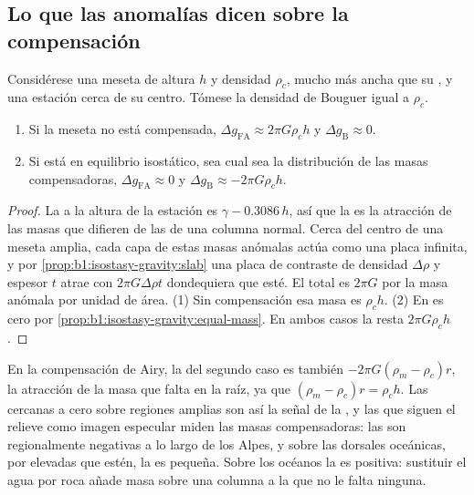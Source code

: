 \subsection*{Lo que las anomalías dicen sobre la compensación}

\begin{proposition}\label{prop:b1:isostasy-gravity:broad}
Considérese una meseta de altura $h$ y densidad $\rho_c$, mucho más ancha que su , y una estación cerca de
su centro. Tómese la densidad de Bouguer igual a $\rho_c$.
\begin{enumerate}
  \item Si la meseta no está compensada, $\Delta g_{\mathrm{FA}} \approx
        2\pi G\rho_c h$ y $\Delta g_{\mathrm B} \approx 0$.
  \item Si está en equilibrio isostático, sea cual sea la distribución de las masas compensadoras,
        $\Delta g_{\mathrm{FA}} \approx 0$ y $\Delta g_{\mathrm B} \approx -2\pi G\rho_c h$.
\end{enumerate}
\end{proposition}

\begin{proof}
La  a la altura de la estación es $\gamma - 0.3086\,h$, así que la  es la atracción de las
masas que difieren de las de una columna normal. Cerca del centro de una meseta amplia, cada capa de estas masas anómalas actúa
como una placa infinita, y por \cref{prop:b1:isostasy-gravity:slab} una placa de contraste de densidad $\Delta\rho$ y espesor $t$
atrae con $2\pi G\Delta\rho
t$ dondequiera que esté. El total es $2\pi G$ por la masa anómala por unidad de área. (1) Sin compensación esa masa es $\rho_c h$.
(2) En  es cero por \cref{prop:b1:isostasy-gravity:equal-mass}. En ambos casos la  resta $2\pi G\rho_c h$.
\end{proof}

En la compensación de Airy, la  del segundo caso es también $-2\pi G(\rho_m - \rho_c)r$, la atracción de la masa
que falta en la raíz, ya que $(\rho_m - \rho_c)r = \rho_c h$. Las  cercanas a cero sobre regiones amplias son
así la señal de la , y las  que siguen el relieve como imagen especular miden las masas compensadoras:
las  son regionalmente negativas a lo largo de los Alpes, y sobre las dorsales oceánicas, por elevadas que estén,
la  es pequeña. Sobre los océanos la  es positiva: sustituir el agua por roca añade masa
sobre una columna a la que no le falta ninguna.

